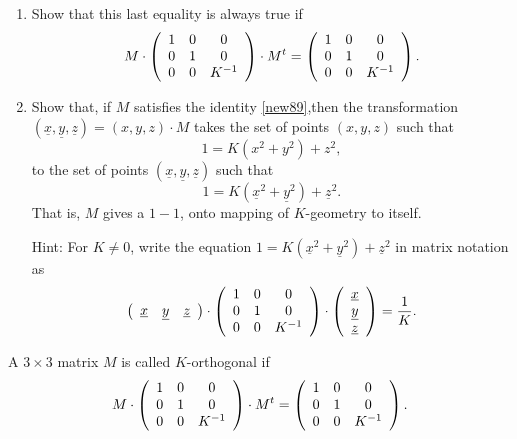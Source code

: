 \begin{exercise}\hfil
\label{87}
\begin{enumerate}
\item  Show that this last equality is always true if%
\begin{equation}
M\cdot\left(
\begin{array}
[c]{ccc}%
1 & 0 & 0\\
0 & 1 & 0\\
0 & 0 & K^{-1}%
\end{array}
\right)  \cdot M^{t}=\left(
\begin{array}
[c]{ccc}%
1 & 0 & 0\\
0 & 1 & 0\\
0 & 0 & K^{-1}%
\end{array}
\right)  . \label{new89}%
\end{equation}

\item Show that, if $M$ satisfies the identity \ref{new89},then the
transformation $\left(  \underline{x},\underline{y},\underline{z}\right)
=\left(  x,y,z\right)  \cdot M$ takes the set of points $\left(  x,y,z\right)
$ such that%
\[
1=K\left(  x^{2}+y^{2}\right)  +z^{2},
\]
to the set of points $\left(  \underline{x},\underline{y},\underline
{z}\right)  $ such that%
\[
1=K\left(  \underline{x}^{2}+\underline{y}^{2}\right)  +\underline{z}^{2}.
\]
That is, $M$ gives a $1-1$, onto mapping of $K$-geometry to itself.

Hint: For $K\neq0$, write the equation $1=K\left(  \underline{x}%
^{2}+\underline{y}^{2}\right)  +\underline{z}^{2}$ in matrix notation as%
\[
\left(
\begin{array}
[c]{ccc}%
\underline{x} & \underline{y} & \underline{z}%
\end{array}
\right)  \cdot\left(
\begin{array}
[c]{ccc}%
1 & 0 & 0\\
0 & 1 & 0\\
0 & 0 & K^{-1}%
\end{array}
\right)  \cdot\left(
\begin{array}
[c]{c}%
\underline{x}\\
\underline{y}\\
\underline{z}%
\end{array}
\right)  =\frac{1}{K}.
\]
\end{enumerate}
\end{exercise}

\begin{definition}
\label{88}A $3\times3$ matrix $M$ is called $K$-orthogonal if
\[
M\cdot\left(
\begin{array}
[c]{ccc}%
1 & 0 & 0\\
0 & 1 & 0\\
0 & 0 & K^{-1}%
\end{array}
\right)  \cdot M^{t}=\left(
\begin{array}
[c]{ccc}%
1 & 0 & 0\\
0 & 1 & 0\\
0 & 0 & K^{-1}%
\end{array}
\right)  .
\]

\end{definition}

